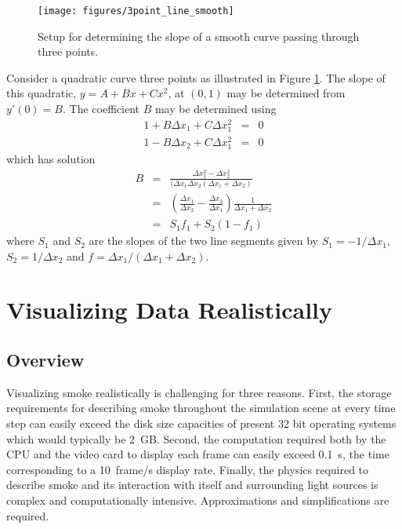 \documentclass[11pt,twoside]{book}
\newcommand{\figoptions}{P}
\begin{document}
\begin{figure}[\figoptions]
\begin{center}
\texttt{[image: figures/3point\_line\_smooth]}
\end{center}
\caption{Setup for determining the slope of a smooth curve passing through three points.}
\label{figlinesmooth}%
\end{figure}
Consider a quadratic curve three points as illustrated in Figure \ref{figlinesmooth}.  The slope of this quadratic, $y=A+Bx+Cx^2$, at $(0,1)$ may be determined from $y'(0)=B$.  The coefficient $B$ may be determined using
\begin{eqnarray*}
1+B\Delta x_1 + C \Delta x_1^2 &= &0\\
1-B\Delta x_2 + C \Delta x_1^2 &= &0
\end{eqnarray*}
which has solution
\begin{eqnarray*}
B&=&\frac{\Delta x_1^2-\Delta x_2^2}{(\Delta x_1\Delta x_2(\Delta x_1+\Delta x_2)}\\
&=&(\frac{\Delta x_1}{\Delta x_2}-\frac{\Delta x_2}{\Delta x_1})\frac{1}{\Delta x_1+\Delta x_2}\\
&=&S_1f_1+S_2(1-f_1)
\end{eqnarray*}
where $S_1$ and $S_2$ are the slopes of the two line segments given by $S_1=-1/\Delta x_1$,
$S_2=1/\Delta x_2$ and $f=\Delta x_1/(\Delta x_1+\Delta x_2)$.


\part{Visualizing Data Realistically}

%
%

\chapter{Overview}
Visualizing smoke realistically is challenging for three reasons.
First, the storage requirements for describing smoke throughout the
simulation scene at every time step can easily exceed the disk
size capacities of present 32 bit operating systems which would
typically be 2~GB. Second, the computation required both by the CPU and
the video card to display each frame can easily exceed 0.1~s, the
time corresponding to a 10~frame/s display rate. Finally, the physics
required to describe smoke and its interaction with itself and
surrounding light sources is complex and computationally
intensive. Approximations and simplifications are required.
\end{document}
